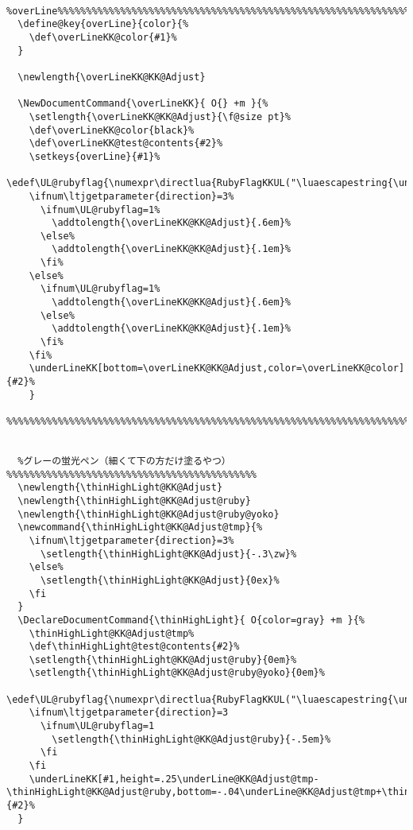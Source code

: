 \documentclass[luatex,fontsize=8pt,paper=b5,twoside]{jlreq}%
\begin{document}
\begin{lstlisting}
  %overLine%%%%%%%%%%%%%%%%%%%%%%%%%%%%%%%%%%%%%%%%%%%%%%%%%%%%%%%%%%%%%%%%%%%%%%%%%%%%%%%%
  \define@key{overLine}{color}{%
    \def\overLineKK@color{#1}%
  }

  \newlength{\overLineKK@KK@Adjust}

  \NewDocumentCommand{\overLineKK}{ O{} +m }{%
    \setlength{\overLineKK@KK@Adjust}{\f@size pt}%
    \def\overLineKK@color{black}%
    \def\overLineKK@test@contents{#2}%
    \setkeys{overLine}{#1}%
    \edef\UL@rubyflag{\numexpr\directlua{RubyFlagKKUL("\luaescapestring{\unexpanded\expandafter{\overLineKK@test@contents}}")}\relax}%
    \ifnum\ltjgetparameter{direction}=3%
      \ifnum\UL@rubyflag=1%
        \addtolength{\overLineKK@KK@Adjust}{.6em}%
      \else%
        \addtolength{\overLineKK@KK@Adjust}{.1em}%
      \fi%
    \else%
      \ifnum\UL@rubyflag=1%
        \addtolength{\overLineKK@KK@Adjust}{.6em}%
      \else%
        \addtolength{\overLineKK@KK@Adjust}{.1em}%
      \fi%
    \fi%
    \underLineKK[bottom=\overLineKK@KK@Adjust,color=\overLineKK@color]{#2}%
    }
  %%%%%%%%%%%%%%%%%%%%%%%%%%%%%%%%%%%%%%%%%%%%%%%%%%%%%%%%%%%%%%%%%%%%%%%%%%%%%%%%%%%%%%%%%


  %グレーの蛍光ペン（細くて下の方だけ塗るやつ）%%%%%%%%%%%%%%%%%%%%%%%%%%%%%%%%%%%%%%%%%%%%
  \newlength{\thinHighLight@KK@Adjust}
  \newlength{\thinHighLight@KK@Adjust@ruby}
  \newlength{\thinHighLight@KK@Adjust@ruby@yoko}
  \newcommand{\thinHighLight@KK@Adjust@tmp}{%
    \ifnum\ltjgetparameter{direction}=3%
      \setlength{\thinHighLight@KK@Adjust}{-.3\zw}%
    \else%
      \setlength{\thinHighLight@KK@Adjust}{0ex}%
    \fi
  }
  \DeclareDocumentCommand{\thinHighLight}{ O{color=gray} +m }{%
    \thinHighLight@KK@Adjust@tmp%
    \def\thinHighLight@test@contents{#2}%
    \setlength{\thinHighLight@KK@Adjust@ruby}{0em}%
    \setlength{\thinHighLight@KK@Adjust@ruby@yoko}{0em}%
    \edef\UL@rubyflag{\numexpr\directlua{RubyFlagKKUL("\luaescapestring{\unexpanded\expandafter{\thinHighLight@test@contents}}")}\relax}%
    \ifnum\ltjgetparameter{direction}=3
      \ifnum\UL@rubyflag=1
        \setlength{\thinHighLight@KK@Adjust@ruby}{-.5em}%
      \fi
    \fi
    \underLineKK[#1,height=.25\underLine@KK@Adjust@tmp-\thinHighLight@KK@Adjust@ruby,bottom=-.04\underLine@KK@Adjust@tmp+\thinHighLight@KK@Adjust+\thinHighLight@KK@Adjust@ruby]{#2}%
  }



\end{lstlisting}
\end{document}
